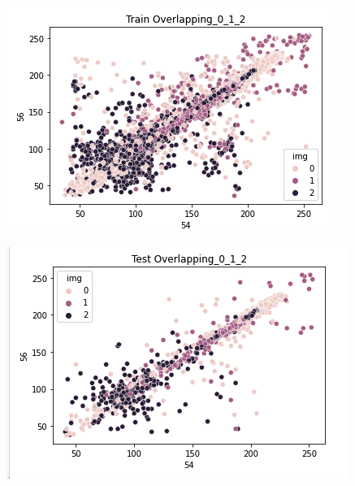 \documentclass[12pt]{article}
\begin{document}
\begin{multicols*}{2}
\begin{center}
		\includegraphics[scale=0.3]{../screenshot/train_scatter_012.png}

		\includegraphics[scale=0.3]{../screenshot/test_scatter_012.png}
		
	\end{center}
\end{multicols*}

		

	
\end{document}
